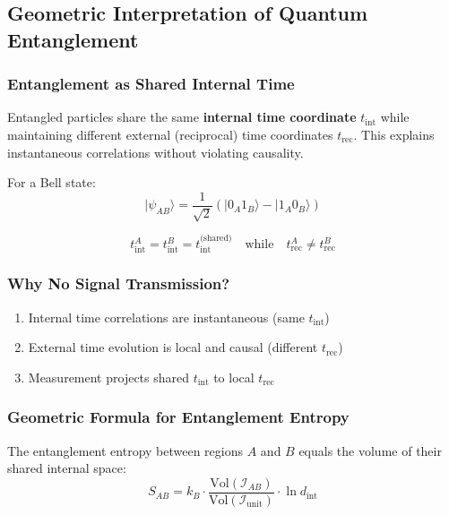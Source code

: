 \subsection{Geometric Interpretation of Quantum Entanglement}

\subsubsection{Entanglement as Shared Internal Time}

\begin{insight}
Entangled particles share the same \textbf{internal time coordinate} $t_{\text{int}}$ while maintaining different external (reciprocal) time coordinates $t_{\text{rec}}$. This explains instantaneous correlations without violating causality.
\end{insight}

For a Bell state:
\begin{equation}
    |\psi_{AB}\rangle = \frac{1}{\sqrt{2}}(|0_A 1_B\rangle - |1_A 0_B\rangle)
\end{equation}

\begin{equation}
    t_{\text{int}}^A = t_{\text{int}}^B = t_{\text{int}}^{\text{(shared)}}
    \quad \text{while} \quad
    t_{\text{rec}}^A \neq t_{\text{rec}}^B
\end{equation}

\subsubsection{Why No Signal Transmission?}

\begin{enumerate}
    \item Internal time correlations are instantaneous (same $t_{\text{int}}$)
    \item External time evolution is local and causal (different $t_{\text{rec}}$)
    \item Measurement projects shared $t_{\text{int}}$ to local $t_{\text{rec}}$
\end{enumerate}

\subsubsection{Geometric Formula for Entanglement Entropy}

\begin{theorem}
The entanglement entropy between regions $A$ and $B$ equals the volume of their shared internal space:
\begin{equation}
    S_{AB} = k_B \cdot \frac{\text{Vol}(\mathcal{I}_{AB})}{\text{Vol}(\mathcal{I}_{\text{unit}})} \cdot \ln d_{\text{int}}
\end{equation}
\end{theorem}


